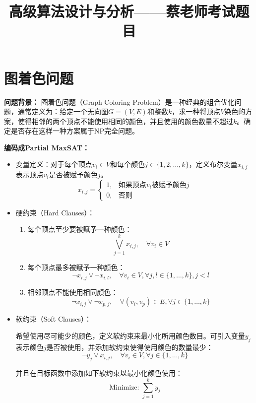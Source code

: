 \documentclass{article}
\title{高级算法设计与分析——蔡老师考试题目}
\author{}
\date{}
\begin{document}
\vspace{-9em}


\section*{图着色问题}
\textbf{问题背景：}
图着色问题（Graph Coloring Problem）是一种经典的组合优化问题，通常定义为：给定一个无向图$G=(V,E)$和整数$k$，求一种将顶点$V$染色的方案，使得相邻的两个顶点不能使用相同的颜色，并且使用的颜色数量不超过$k$。确定是否存在这样一种方案属于NP完全问题。




\textbf{编码成Partial MaxSAT：}
\begin{itemize}
    \item 变量定义：对于每个顶点$v_i \in V$和每个颜色$j \in \{1,2,\dots,k\}$，定义布尔变量$x_{i,j}$表示顶点$v_i$是否被赋予颜色$j$。
    \[
    x_{i,j} = 
    \begin{cases}
    1, & \text{如果顶点$v_i$被赋予颜色$j$}\\[4pt]
    0, & \text{否则}
    \end{cases}
    \]

    \item 硬约束（Hard Clauses）：
    \begin{enumerate}
        \item 每个顶点至少要被赋予一种颜色：
        \[
        \bigvee_{j=1}^{k} x_{i,j},\quad \forall v_i \in V
        \]

        \item 每个顶点最多被赋予一种颜色：
        \[
        \neg x_{i,j} \vee \neg x_{i,l},\quad \forall v_i \in V, \forall j,l \in \{1,\dots,k\}, j<l
        \]

        \item 相邻顶点不能使用相同颜色：
        \[
        \neg x_{i,j} \vee \neg x_{p,j},\quad \forall (v_i,v_p)\in E, \forall j\in\{1,\dots,k\}
        \]
    \end{enumerate}

    \item 软约束（Soft Clauses）：
    
    希望使用尽可能少的颜色，定义软约束来最小化所用颜色数目。可引入变量$y_j$表示颜色$j$是否被使用，并添加软约束使得使用颜色的数量最少：
    \[
    \neg y_j \vee x_{i,j},\quad \forall v_i\in V, \forall j\in\{1,\dots,k\}
    \]
    
    并且在目标函数中添加如下软约束以最小化颜色使用：
    \[
    \text{Minimize: } \sum_{j=1}^{k} y_j
    \]

\end{itemize}
\end{document}
